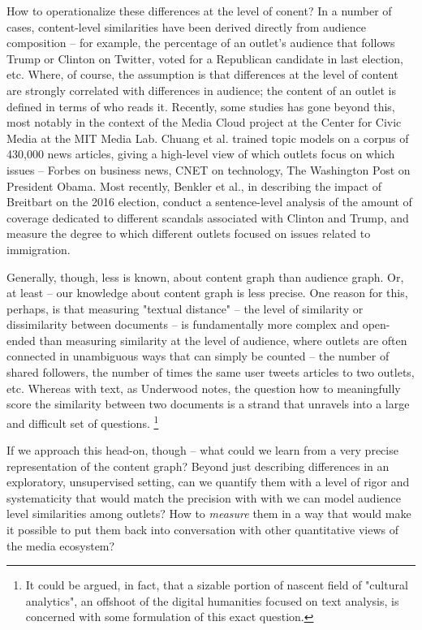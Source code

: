 \documentclass{scrartcl}
\begin{document}
How to operationalize these differences at the level of conent? In a number of cases, content-level similarities have been derived directly from audience composition -- for example, the percentage of an outlet's audience that follows Trump or Clinton on Twitter, voted for a Republican candidate in last election, etc. Where, of course, the assumption is that differences at the level of content are strongly correlated with differences in audience; the content of an outlet is defined in terms of who reads it. Recently, some studies has gone beyond this, most notably in the context of the Media Cloud project at the Center for Civic Media at the MIT Media Lab. Chuang et al. trained topic models on a corpus of 430,000 news articles, giving a high-level view of which outlets focus on which issues -- Forbes on business news, CNET on technology, The Washington Post on President Obama.\cite{chuang2014large} Most recently, Benkler et al., in describing the impact of Breitbart on the 2016 election, conduct a sentence-level analysis of the amount of coverage dedicated to different scandals associated with Clinton and Trump, and measure the degree to which different outlets focused on issues related to immigration.

Generally, though, less is known, about content graph than audience graph. Or, at least -- our knowledge about content graph is less precise. One reason for this, perhaps, is that measuring "textual distance" -- the level of similarity or dissimilarity between documents -- is fundamentally more complex and open-ended than measuring similarity at the level of audience, where outlets are often connected in unambiguous ways that can simply be counted -- the number of shared followers, the number of times the same user tweets articles to two outlets, etc. Whereas with text, as Underwood notes, the question how to meaningfully score the similarity between two documents is a strand that unravels into a large and difficult set of questions. \footnote{It could be argued, in fact, that a sizable portion of nascent field of "cultural analytics", an offshoot of the digital humanities focused on text analysis, is concerned with some formulation of this exact question.}

If we approach this head-on, though -- what could we learn from a very precise representation of the content graph? Beyond just describing differences in an exploratory, unsupervised setting, can we quantify them with a level of rigor and systematicity that would match the precision with with we can model audience level similarities among outlets? How to \textit{measure} them in a way that would make it possible to put them back into conversation with other quantitative views of the media ecosystem?
\end{document}
